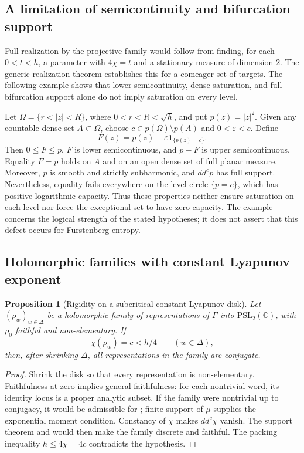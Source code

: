 \documentclass[11pt,letterpaper]{amsart}
\newtheorem{proposition}[theorem]{Proposition}
\theoremstyle{definition}
\theoremstyle{remark}
\numberwithin{equation}{section}
\begin{document}
\subsection{A limitation of semicontinuity and bifurcation support}

Full realization by the projective family would follow from finding,
for each $0<t<h$, a parameter with $4\chi=t$ and a stationary measure
of dimension $2$. The generic realization theorem establishes this
for a comeager set of targets. The following example shows that
lower semicontinuity, dense saturation, and full bifurcation support
alone do not imply saturation on every level.

Let $\Omega=\{r<|z|<R\}$, where $0<r<R<\sqrt h$, and put
$p(z)=|z|^2$. Given any countable dense set $A\subset\Omega$,
choose $c\in p(\Omega)\setminus p(A)$ and $0<\varepsilon<c$.
Define
\[
 F(z)=p(z)-\varepsilon\mathbf1_{\{p(z)=c\}}.
\]
Then $0\le F\le p$, $F$ is lower semicontinuous, and $p-F$ is
upper semicontinuous. Equality $F=p$ holds on $A$ and on an open
dense set of full planar measure. Moreover, $p$ is smooth and strictly
subharmonic, and $dd^cp$ has full support. Nevertheless, equality
fails everywhere on the level circle $\{p=c\}$, which has positive
logarithmic capacity. Thus these properties neither ensure saturation
on each level nor force the exceptional set to have zero capacity.
The example concerns the logical strength of the stated hypotheses;
it does not assert that this defect occurs for Furstenberg entropy.

\subsection{Holomorphic families with constant Lyapunov exponent}

\begin{proposition}[Rigidity on a subcritical constant-Lyapunov disk]
\label{prop:constant-lyapunov-disk}
Let $(\rho_w)_{w\in\Delta}$ be a holomorphic family of representations
of $\Gamma$ into $\mathrm{PSL}_2(\mathbb C)$, with $\rho_0$
faithful and non-elementary. If
\[
 \chi(\rho_w)=c<h/4\qquad(w\in\Delta),
\]
then, after shrinking $\Delta$, all representations in the family
are conjugate.
\end{proposition}
\begin{proof}
Shrink the disk so that every representation is non-elementary.
Faithfulness at zero implies general faithfulness: for each nontrivial
word, its identity locus is a proper analytic subset. If the family
were nontrivial up to conjugacy, it would be admissible for
\cite[Theorem~3.9]{DD}; finite support of $\mu$ supplies the
exponential moment condition. Constancy of $\chi$ makes $dd^c\chi$
vanish. The support theorem and \cite[Theorem~2.6]{DD} would then
make the family discrete and faithful. The packing inequality
$h\le4\chi=4c$ contradicts the hypothesis.
\end{proof}
\end{document}
